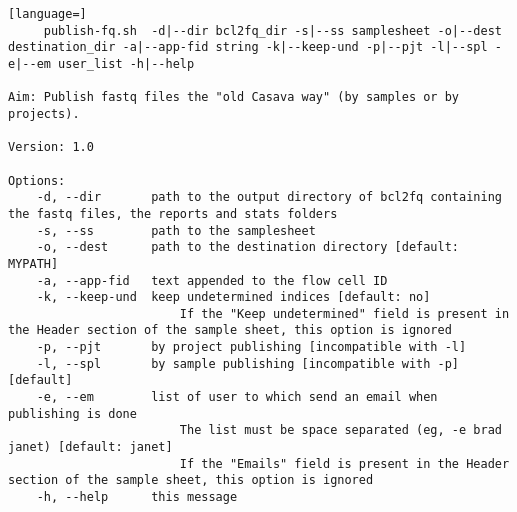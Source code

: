 \documentclass[11pt]{report}
\begin{document}
\begin{lstlisting}[language=]
     publish-fq.sh  -d|--dir bcl2fq_dir -s|--ss samplesheet -o|--dest destination_dir -a|--app-fid string -k|--keep-und -p|--pjt -l|--spl -e|--em user_list -h|--help

Aim: Publish fastq files the "old Casava way" (by samples or by projects).

Version: 1.0

Options:
    -d, --dir       path to the output directory of bcl2fq containing the fastq files, the reports and stats folders
    -s, --ss        path to the samplesheet
    -o, --dest      path to the destination directory [default: MYPATH]
    -a, --app-fid   text appended to the flow cell ID
    -k, --keep-und  keep undetermined indices [default: no]
                        If the "Keep undetermined" field is present in the Header section of the sample sheet, this option is ignored
    -p, --pjt       by project publishing [incompatible with -l]
    -l, --spl       by sample publishing [incompatible with -p] [default]
    -e, --em        list of user to which send an email when publishing is done
                        The list must be space separated (eg, -e brad janet) [default: janet]
                        If the "Emails" field is present in the Header section of the sample sheet, this option is ignored
    -h, --help      this message
\end{lstlisting}
\end{document}
